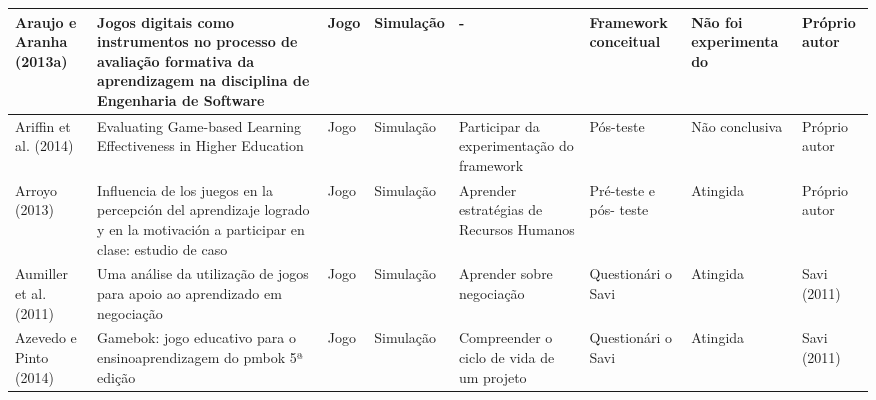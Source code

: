 \begin{table}
{\begin{tabular}{|L|m{5cm}|L|L|m{2.5cm}|m{2cm}|L|L|}
Araujo e Aranha (2013a)        & Jogos digitais como instrumentos no processo de avaliação formativa da aprendizagem na disciplina de Engenharia de Software                                                                            & Jogo                  & Simulação           & -                                                                          & Framework conceitual                                                & Não foi experimenta do & Próprio autor                                           \\ \hline
Ariffin et al. (2014)          & Evaluating Game-based Learning Effectiveness in Higher Education                                                                                                                                       & Jogo                  & Simulação           & Participar da experimentação do framework                                  & Pós-teste                                                           & Não conclusiva         & Próprio autor                                           \\ \hline
Arroyo (2013)                  & Influencia de los juegos en la percepción del aprendizaje logrado y en la motivación a participar en clase: estudio de caso                                                                            & Jogo                  & Simulação           & Aprender estratégias de Recursos Humanos                                   & Pré-teste e pós- teste                                              & Atingida               & Próprio autor                                           \\ \hline
Aumiller et al. (2011)         & Uma análise da utilização de jogos para apoio ao aprendizado em negociação                                                                                                                             & Jogo                  & Simulação           & Aprender sobre negociação                                                  & Questionári o Savi                                                  & Atingida               & Savi (2011)                                             \\ \hline
Azevedo e Pinto (2014)         & Gamebok: jogo educativo para o ensinoaprendizagem do pmbok 5ª edição                                                                                                                                   & Jogo                  & Simulação           & Compreender o ciclo de vida de um projeto                                  & Questionári o Savi                                                  & Atingida               & Savi (2011)                                             \\ \hline

\end{tabular}}
\end{table}
